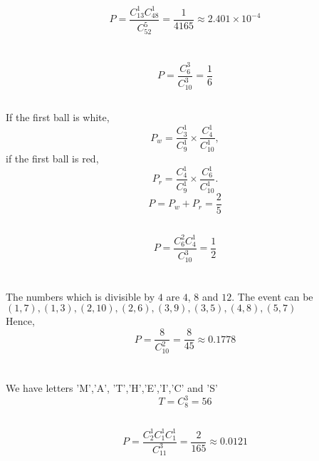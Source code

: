\documentclass{article}
\begin{document}
        \subsection{}
                $$P=\frac{C_{13}^1 C_{48}^1}{C_{52}^5}=\frac{1}{4165}\approx 2.401\times 10^{-4}$$

    \section{}
        \subsection{}
                $$P=\frac{C_6^3}{C_{10}^3}=\frac{1}{6}$$
        
        \subsection{}
                If the first ball is white,
                        $$P_w=\frac{C_3^1}{C_9^1}\times \frac{C_4 ^1}{C_{10}^1},$$
                if the first ball is red,
                        $$P_r=\frac{C_4^1}{C_9^1}\times \frac{C_6 ^1}{C_{10}^1}.$$
                $$P=P_w+P_r=\frac{2}{5}$$

        \subsection{}
                $$P=\frac{C_6^2C_4^1}{C_{10}^3}=\frac{1}{2}$$

    \section{}
                The numbers which is divisible by $4$ are $4$, $8$ and $12$.
                The event can be $(1,7),(1,3),(2,10),(2,6),(3,9),(3,5),(4,8),(5,7)$
                \\
                Hence,
                $$P=\frac{8}{C_{10}^2}=\frac{8}{45}\approx 0.1778$$

    \section{}
        \subsection{}  
                We have letters 'M','A', 'T','H','E','I','C' and 'S'           
                $$T=C_{8}^{3}=56$$
        \subsection{}
                $$P=\frac{C_{2}^1C_{1}^1C_{1}^1}{C_{11}^3}=\frac{2}{165}\approx 0.0121$$
\end{document}
